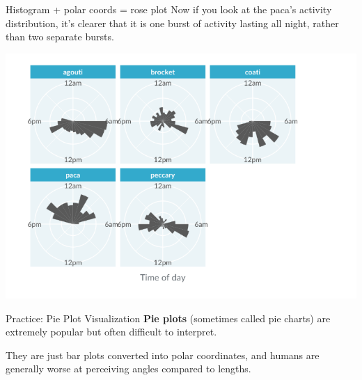 \documentclass[
  ignorenonframetext,
]{beamer}
\begin{document}
\begin{frame}{Histogram + polar coords = rose plot}
\label{histogram-polar-coords-rose-plot-1}
Now if you look at the paca's activity distribution, it's clearer that
it is one burst of activity lasting all night, rather than two separate
bursts.

\includegraphics{../images/im105.png}
\end{frame}

\begin{frame}{Practice: Pie Plot Visualization}
\label{practice-pie-plot-visualization}
\textbf{Pie plots} (sometimes called pie charts) are extremely popular
but often difficult to interpret.

They are just bar plots converted into polar coordinates, and humans are
generally worse at perceiving angles compared to lengths.
\end{frame}
\end{document}
